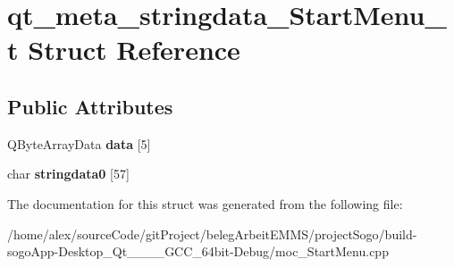 \hypertarget{structqt__meta__stringdata__StartMenu__t}{\section{qt\-\_\-meta\-\_\-stringdata\-\_\-\-Start\-Menu\-\_\-t Struct Reference}
\label{structqt__meta__stringdata__StartMenu__t}
}
\subsection*{Public Attributes}
\begin{DoxyCompactItemize}
\item 
\hypertarget{structqt__meta__stringdata__StartMenu__t_a0cae9d035e55837d02d644d69ed2360c}{Q\-Byte\-Array\-Data {\bfseries data} \mbox{[}5\mbox{]}}\label{structqt__meta__stringdata__StartMenu__t_a0cae9d035e55837d02d644d69ed2360c}

\item 
\hypertarget{structqt__meta__stringdata__StartMenu__t_a3efbc8fc0c21e9bac4895647857346c7}{char {\bfseries stringdata0} \mbox{[}57\mbox{]}}\label{structqt__meta__stringdata__StartMenu__t_a3efbc8fc0c21e9bac4895647857346c7}

\end{DoxyCompactItemize}


The documentation for this struct was generated from the following file\-:\begin{DoxyCompactItemize}
\item 
/home/alex/source\-Code/git\-Project/beleg\-Arbeit\-E\-M\-M\-S/project\-Sogo/build-\/sogo\-App-\/\-Desktop\-\_\-\-Qt\-\_\-\_\-\_\-\_\-\-G\-C\-C\-\_\-64bit-\/\-Debug/moc\-\_\-\-Start\-Menu.\-cpp\end{DoxyCompactItemize}
